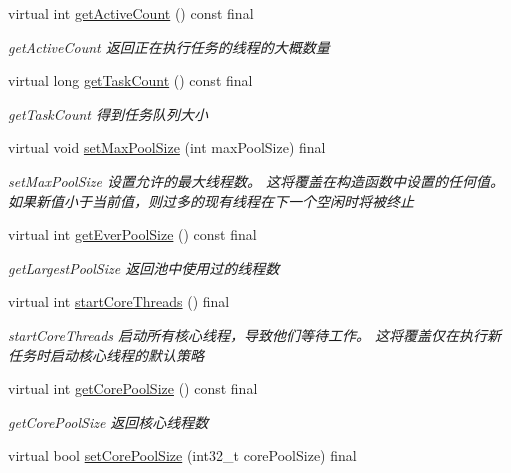 \begin{DoxyCompactItemize}
virtual int \hyperlink{classThreadPoolExecutor_ac9345329aa167200bec31951d2f5a690}{get\+Active\+Count} () const final
\begin{DoxyCompactList}\small\item\em get\+Active\+Count 返回正在执行任务的线程的大概数量 \end{DoxyCompactList}\item 
virtual long \hyperlink{classThreadPoolExecutor_a396d50079b39787928ead5f122781de6}{get\+Task\+Count} () const final
\begin{DoxyCompactList}\small\item\em get\+Task\+Count 得到任务队列大小 \end{DoxyCompactList}\item 
virtual void \hyperlink{classThreadPoolExecutor_ac5a10d336958ca43530b31bff81c9c4b}{set\+Max\+Pool\+Size} (int max\+Pool\+Size) final
\begin{DoxyCompactList}\small\item\em set\+Max\+Pool\+Size 设置允许的最大线程数。 这将覆盖在构造函数中设置的任何值。 如果新值小于当前值，则过多的现有线程在下一个空闲时将被终止 \end{DoxyCompactList}\item 
virtual int \hyperlink{classThreadPoolExecutor_af630e5117b4f67428a4fcbee5c15a7d9}{get\+Ever\+Pool\+Size} () const final
\begin{DoxyCompactList}\small\item\em get\+Largest\+Pool\+Size 返回池中使用过的线程数 \end{DoxyCompactList}\item 
virtual int \hyperlink{classThreadPoolExecutor_a1ee7a201ac0a8c9bd246a83939e39194}{start\+Core\+Threads} () final
\begin{DoxyCompactList}\small\item\em start\+Core\+Threads 启动所有核心线程，导致他们等待工作。 这将覆盖仅在执行新任务时启动核心线程的默认策略 \end{DoxyCompactList}\item 
virtual int \hyperlink{classThreadPoolExecutor_af29377a50af53031bb06aeacf9ef27f7}{get\+Core\+Pool\+Size} () const final
\begin{DoxyCompactList}\small\item\em get\+Core\+Pool\+Size 返回核心线程数 \end{DoxyCompactList}\item 
virtual bool \hyperlink{classThreadPoolExecutor_a56311f5d8aefa64b8c67fd9ff89c204c}{set\+Core\+Pool\+Size} (int32\+\_\+t core\+Pool\+Size) final

\end{DoxyCompactItemize}

